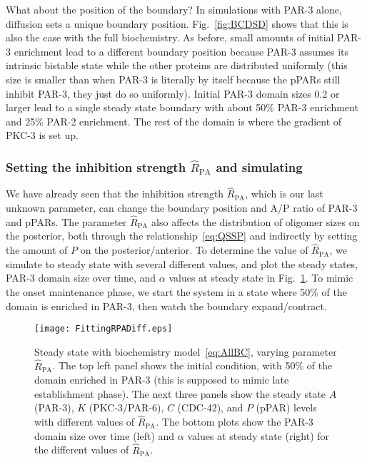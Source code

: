 \documentclass[11pt]{article}
\newcommand{\6}[1]{#1_{\text{6}}}
\newcommand{\3}[1]{#1_{\text{3}}}
\begin{document}
What about the position of the boundary? In simulations with PAR-3 alone, diffusion sets a unique boundary position. Fig.\ \ref{fig:BCDSD} shows that this is also the case with the full biochemistry. As before, small amounts of initial PAR-3 enrichment lead to a different boundary position because PAR-3 assumes its intrinsic bistable state while the other proteins are distributed uniformly (this size is smaller than when PAR-3 is literally by itself because the pPARs still inhibit PAR-3, they just do so uniformly). Initial PAR-3 domain sizes 0.2 or larger lead to a single steady state boundary with about 50\% PAR-3 enrichment and 25\% PAR-2 enrichment. The rest of the domain is where the gradient of PKC-3 is set up.



\subsubsection{Setting the inhibition strength $\hat R_\text{PA}$ and simulating}
We have already seen that the inhibition strength $\hat R_\text{PA}$, which is our last unknown parameter, can change the boundary position and A/P ratio of PAR-3 and pPARs. The parameter $\hat R_\text{PA}$ also affects the distribution of oligomer sizes on the posterior, both through the relationship\ \eqref{eq:QSSP} and indirectly by setting the amount of $P$ on the posterior/anterior. To determine the value of $\hat R_\text{PA}$, we simulate to steady state with several different values, and plot the steady states, PAR-3 domain size over time, and $\alpha$ values at steady state in Fig.\ \ref{fig:BCSS}. To mimic the onset maintenance phase, we start the system in a state where 50\% of the domain is enriched in PAR-3, then watch the boundary expand/contract.

\begin{figure}
\centering
\texttt{[image: FittingRPADiff.eps]}
\caption{\label{fig:BCSS}Steady state with biochemistry model\ \eqref{eq:AllBC}, varying parameter $\hat R_\text{PA}$. The top left panel shows the initial condition, with 50\% of the domain enriched in PAR-3 (this is supposed to mimic late establishment phase). The next three panels show the steady state $A$ (PAR-3), $K$ (PKC-3/PAR-6), $C$ (CDC-42), and $P$ (pPAR) levels with different values of $\hat R_\text{PA}$. The bottom plots show the PAR-3 domain size over time (left) and $\alpha$ values at steady state (right) for the different values of $\hat R_\text{PA}$. }
\end{figure}
\end{document}
